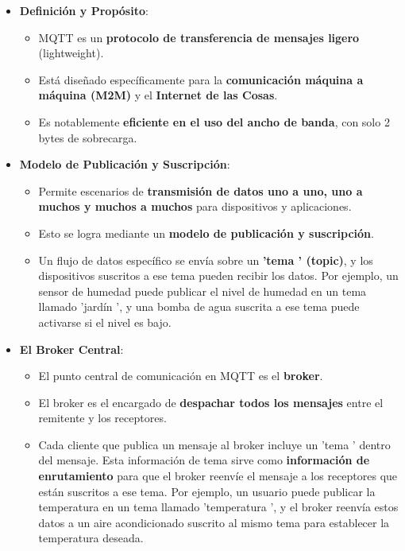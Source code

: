 \documentclass{report}
\begin{document}
\begin{itemize}
    \item \textbf{Definición y Propósito}:
    \begin{itemize}
        \item MQTT es un \textbf{protocolo de transferencia de mensajes ligero} (lightweight).
        \item Está diseñado específicamente para la \textbf{comunicación máquina a máquina (M2M)} y el \textbf{Internet de las Cosas}.
        \item Es notablemente \textbf{eficiente en el uso del ancho de banda}, con solo 2 bytes de sobrecarga.
    \end{itemize}

    \item \textbf{Modelo de Publicación y Suscripción}:
    \begin{itemize}
        \item Permite escenarios de \textbf{transmisión de datos uno a uno, uno a muchos y muchos a muchos} para dispositivos y aplicaciones.
        \item Esto se logra mediante un \textbf{modelo de publicación y suscripción}.
        \item Un flujo de datos específico se envía sobre un \textbf{ 'tema ' (topic)}, y los dispositivos suscritos a ese tema pueden recibir los 
        datos. Por ejemplo, un sensor de humedad puede publicar el nivel de humedad en un tema llamado  'jardín ', y una bomba de agua suscrita a 
        ese tema puede activarse si el nivel es bajo.
    \end{itemize}

    \item \textbf{El Broker Central}:
    \begin{itemize}
        \item El punto central de comunicación en MQTT es el \textbf{broker}.
        \item El broker es el encargado de \textbf{despachar todos los mensajes} entre el remitente y los receptores.
        \item Cada cliente que publica un mensaje al broker incluye un  'tema ' dentro del mensaje. Esta información de tema sirve como 
        \textbf{información de enrutamiento} para que el broker reenvíe el mensaje a los receptores que están suscritos a ese tema. Por ejemplo, 
        un usuario puede publicar la temperatura en un tema llamado  'temperatura ', y el broker reenvía estos datos a un aire acondicionado 
        suscrito al mismo tema para establecer la temperatura deseada.
    \end{itemize}


\end{itemize}
\end{document}
